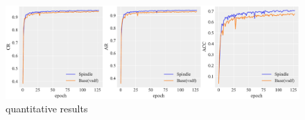 
\begin{figure}[!t]
    \begin{center}
    \includegraphics[width=1.0\linewidth]{figures/quantitative.pdf}
    \end{center}
    \caption{quantitative results}
    \label{fig:quantitative}
\end{figure}

    